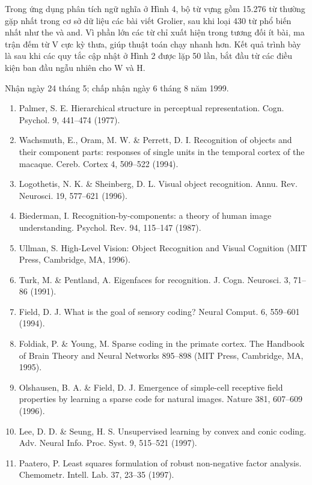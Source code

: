 Trong ứng dụng phân tích ngữ nghĩa ở Hình 4, bộ từ vựng gồm 15.276 từ thường gặp nhất trong cơ sở dữ liệu các bài viết Grolier, sau khi loại 430 từ phổ biến nhất như \textquotesingle the\textquotesingle{} và \textquotesingle and\textquotesingle. Vì phần lớn các từ chỉ xuất hiện trong tương đối ít bài, ma trận đếm từ V cực kỳ thưa, giúp thuật toán chạy nhanh hơn. Kết quả trình bày là sau khi các quy tắc cập nhật ở Hình 2 được lặp 50 lần, bắt đầu từ các điều kiện ban đầu ngẫu nhiên cho W và H.

Nhận ngày 24 tháng 5; chấp nhận ngày 6 tháng 8 năm 1999.

\begin{enumerate}
\def\labelenumi{\arabic{enumi}.}
\item
  Palmer, S. E. Hierarchical structure in perceptual representation. Cogn. Psychol. 9, 441--474 (1977).
\item
  Wachsmuth, E., Oram, M. W. \& Perrett, D. I. Recognition of objects and their component parts: responses of single units in the temporal cortex of the macaque. Cereb. Cortex 4, 509--522 (1994).
\item
  Logothetis, N. K. \& Sheinberg, D. L. Visual object recognition. Annu. Rev. Neurosci. 19, 577--621 (1996).
\item
  Biederman, I. Recognition-by-components: a theory of human image understanding. Psychol. Rev. 94, 115--147 (1987).
\item
  Ullman, S. High-Level Vision: Object Recognition and Visual Cognition (MIT Press, Cambridge, MA, 1996).
\item
  Turk, M. \& Pentland, A. Eigenfaces for recognition. J. Cogn. Neurosci. 3, 71--86 (1991).
\item
  Field, D. J. What is the goal of sensory coding? Neural Comput. 6, 559--601 (1994).
\item
  Foldiak, P. \& Young, M. Sparse coding in the primate cortex. The Handbook of Brain Theory and Neural Networks 895--898 (MIT Press, Cambridge, MA, 1995).
\item
  Olshausen, B. A. \& Field, D. J. Emergence of simple-cell receptive field properties by learning a sparse code for natural images. Nature 381, 607--609 (1996).
\item
  Lee, D. D. \& Seung, H. S. Unsupervised learning by convex and conic coding. Adv. Neural Info. Proc. Syst. 9, 515--521 (1997).
\item
  Paatero, P. Least squares formulation of robust non-negative factor analysis. Chemometr. Intell. Lab. 37, 23--35 (1997).

\end{enumerate}

